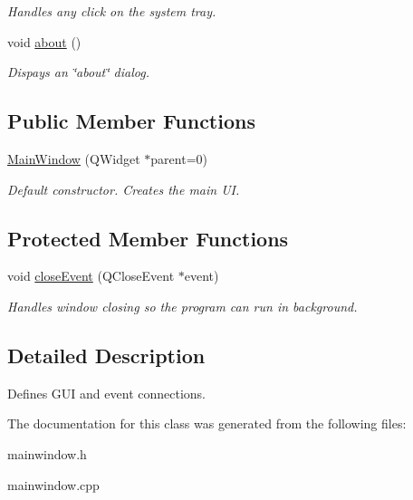 \begin{DoxyCompactItemize}
\begin{DoxyCompactList}\small\item\em Handles any click on the system tray. \item\end{DoxyCompactList}\item 
\hypertarget{classMainWindow_a7be6a5d98970ac1a6296c6f9aee1e9bb}{
void \hyperlink{classMainWindow_a7be6a5d98970ac1a6296c6f9aee1e9bb}{about} ()}
\label{classMainWindow_a7be6a5d98970ac1a6296c6f9aee1e9bb}

\begin{DoxyCompactList}\small\item\em Dispays an \char`\"{}about\char`\"{} dialog. \item\end{DoxyCompactList}\end{DoxyCompactItemize}
\subsection*{Public Member Functions}
\begin{DoxyCompactItemize}
\item 
\hypertarget{classMainWindow_a8b244be8b7b7db1b08de2a2acb9409db}{
\hyperlink{classMainWindow_a8b244be8b7b7db1b08de2a2acb9409db}{MainWindow} (QWidget $\ast$parent=0)}
\label{classMainWindow_a8b244be8b7b7db1b08de2a2acb9409db}

\begin{DoxyCompactList}\small\item\em Default constructor. Creates the main UI. \item\end{DoxyCompactList}\end{DoxyCompactItemize}
\subsection*{Protected Member Functions}
\begin{DoxyCompactItemize}
\item 
\hypertarget{classMainWindow_a4e20a4a065fbb0e4d3532a45a0a91425}{
void \hyperlink{classMainWindow_a4e20a4a065fbb0e4d3532a45a0a91425}{closeEvent} (QCloseEvent $\ast$event)}
\label{classMainWindow_a4e20a4a065fbb0e4d3532a45a0a91425}

\begin{DoxyCompactList}\small\item\em Handles window closing so the program can run in background. \item\end{DoxyCompactList}\end{DoxyCompactItemize}


\subsection{Detailed Description}
Defines GUI and event connections. 

The documentation for this class was generated from the following files:\begin{DoxyCompactItemize}
\item 
mainwindow.h\item 
mainwindow.cpp\end{DoxyCompactItemize}
